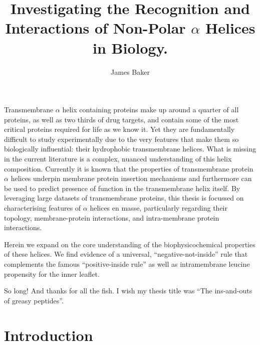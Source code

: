 \documentclass[12pt,PhD,twoside]{muthesis}
\begin{document}
\title{Investigating the Recognition and Interactions of Non-Polar $\alpha$ Helices in Biology.}
\author{James Baker}
\def\wordcount{xxxxx}




\beforeabstract

Transmembrane $\alpha$ helix containing proteins make up around a quarter of all proteins, as well as two thirds of drug targets, and contain some of the most critical proteins required for life as we know it. Yet they are fundamentally difficult to study experimentally due to the very features that make them so biologically influential: their hydrophobic transmembrane helices. What is missing in the current literature is a complex, nuanced understanding of this helix composition. Currently it is known that the properties of transmembrane protein $\alpha$ helices underpin membrane protein insertion mechanisms and furthermore can be used to predict presence of function in the transmembrane helix itself. By leveraging large datasets of transmembrane proteins, this thesis is focussed on characterising features of $\alpha$ helices en masse, particularly regarding their topology, membrane-protein interactions, and intra-membrane protein interactions.

Herein we expand on the core understanding of the biophysicochemical properties of these helices. We find evidence of a universal, ``negative-not-inside'' rule that complements the famous ``positive-inside rule'' as well as intramembrane leucine propensity for the inner leaflet.

\afterabstract

So long! And thanks for all the fish. I wish my thesis title was ``The ins-and-outs of greasy peptides''.


\afterpreface %

\chapter{Introduction}
\end{document}
